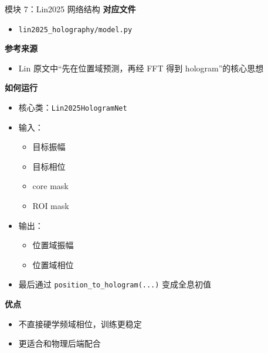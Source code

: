 \documentclass[aspectratio=169,10pt]{ctexbeamer}
\begin{document}
\begin{frame}{模块 7：Lin2025 网络结构}
  \textbf{对应文件}
  \begin{itemize}
    \item \texttt{lin2025\_holography/model.py}
  \end{itemize}

  \textbf{参考来源}
  \begin{itemize}
    \item Lin 原文中“先在位置域预测，再经 FFT 得到 hologram”的核心思想
  \end{itemize}

  \textbf{如何运行}
  \begin{itemize}
    \item 核心类：\texttt{Lin2025HologramNet}
    \item 输入：
    \begin{itemize}
      \item 目标振幅
      \item 目标相位
      \item core mask
      \item ROI mask
    \end{itemize}
    \item 输出：
    \begin{itemize}
      \item 位置域振幅
      \item 位置域相位
    \end{itemize}
    \item 最后通过 \texttt{position\_to\_hologram(...)} 变成全息初值
  \end{itemize}

  \textbf{优点}
  \begin{itemize}
    \item 不直接硬学频域相位，训练更稳定
    \item 更适合和物理后端配合
  \end{itemize}
\end{frame}
\end{document}
